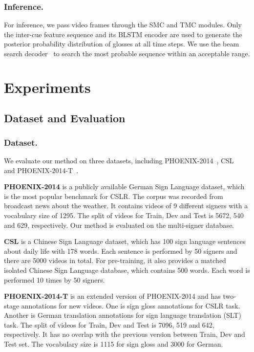 \documentclass[letterpaper]{article} %
\begin{document}
\subsubsection{Inference.}
For inference, we pass video frames through the SMC and TMC modules. Only the inter-cue feature sequence and its BLSTM encoder are used to generate the posterior probability distribution of glosses at all time steps. We use the beam search decoder~\cite{deepspeech} to search the most probable sequence within an acceptable range.

\section{Experiments}
\subsection{Dataset and Evaluation}
\subsubsection{Dataset.}
We evaluate our method on three datasets, including PHOENIX-2014~\cite{phoenixdataset2014}, CSL~\cite{han,hlstm} and PHOENIX-2014-T~\cite{phoenix2014t}. 

\textbf{PHOENIX-2014} is a publicly available German Sign Language dataset, which is the most popular benchmark for CSLR. The corpus was recorded from broadcast news about the weather. It contains videos of 9 different signers with a vocabulary size of 1295. The split of videos for Train, Dev and Test is 5672, 540 and 629, respectively. Our method is evaluated on the multi-signer database.

\textbf{CSL} is a Chinese Sign Language dataset, which has 100 sign language sentences about daily life with 178 words. Each sentence is performed by 50 signers and there are 5000 videos in total. For pre-training, it also provides a matched isolated Chinese Sign Language database,  
which contains 500 words. Each word is performed 10 times by 50 signers. 

\textbf{PHOENIX-2014-T} is an extended version of PHOENIX-2014 and has two-stage annotations for new videos.
One is sign gloss annotations for CSLR task. Another is German translation annotations for sign language translation (SLT) task. The split of videos for Train, Dev and Test is 7096, 519 and 642, respectively. It has no overlap with the previous version between Train, Dev and Test set. The vocabulary size is 1115 for sign gloss and 3000 for German. 
\end{document}
